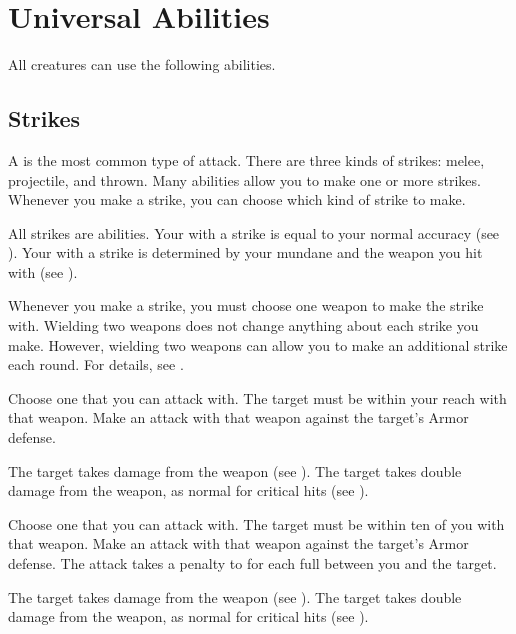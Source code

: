 \section{Universal Abilities}\label{Universal Abilities}
    All creatures can use the following abilities.

    \subsection{Strikes}\label{Strikes}
        A  is the most common type of attack.
        There are three kinds of strikes: melee, projectile, and thrown.
        Many abilities allow you to make one or more strikes.
        Whenever you make a strike, you can choose which kind of strike to make.

        All strikes are  abilities.
        Your  with a strike is equal to your normal accuracy (see ).
        Your  with a strike is determined by your mundane  and the weapon you hit with (see ).

        Whenever you make a strike, you must choose one weapon to make the strike with.
        Wielding two weapons does not change anything about each strike you make.
        However, wielding two weapons can allow you to make an additional strike each round.
        For details, see .

        \begin{freeability}{}
            Choose one  that you can attack with.
            The target must be within your reach with that weapon.
            Make an attack with that weapon against the target's Armor defense.

            \hit The target takes damage from the weapon (see ).
            \crit The target takes double damage from the weapon, as normal for critical hits (see ).
        \end{freeability}

        \begin{freeability}{}
            Choose one  that you can attack with.
            The target must be within ten  of you with that weapon.
            Make an attack with that weapon against the target's Armor defense.
            The attack takes a  penalty to  for each full  between you and the target.

            \hit The target takes damage from the weapon (see ).
            \crit The target takes double damage from the weapon, as normal for critical hits (see ).
        \end{freeability}

